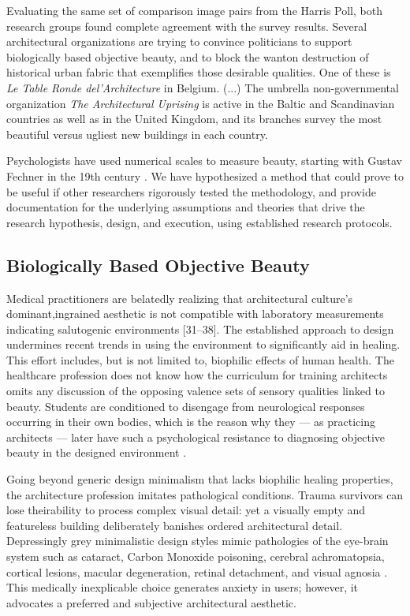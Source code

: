 \documentclass[a4paper]{article}
\begin{document}
Evaluating the same set of comparison image pairs from the Harris Poll, both research groups found complete agreement with the survey results. Several architectural organizations are trying to convince politicians to support biologically based objective beauty, and to block the wanton destruction of historical urban fabric that exemplifies those desirable qualities. One of these is \textit{Le Table Ronde del’Architecture} in Belgium. (...) The umbrella non-governmental organization \textit{The Architectural Uprising} is active in the Baltic and Scandinavian countries as well as in the United Kingdom, and its branches survey the most beautiful versus ugliest new buildings in each country.

Psychologists have used numerical scales to measure beauty, starting with Gustav Fechner in the 19th century \cite{brielmann_intense_2019}. We have hypothesized a method that could prove to be useful if other researchers rigorously tested the methodology, and provide documentation for the underlying assumptions and theories that drive the research hypothesis, design, and execution, using established research protocols.

\subsection{Biologically Based Objective Beauty}

Medical practitioners are belatedly realizing that architectural culture’s dominant,ingrained aesthetic is not compatible with laboratory measurements indicating salutogenic environments [31–38]. The established approach to design undermines recent trends in using the environment to significantly aid in healing. This effort includes, but is not limited to, biophilic effects of human health. The healthcare profession does not know how the curriculum for training architects omits any discussion of the opposing valence sets of sensory qualities linked to beauty. Students are conditioned to disengage from neurological responses occurring in their own bodies, which is the reason why they — as practicing architects — later have such a psychological resistance to diagnosing objective beauty in the designed environment \cite{salingaros_what_2017}.

Going beyond generic design minimalism that lacks biophilic healing properties, the architecture profession imitates pathological conditions. Trauma survivors can lose theirability to process complex visual detail: yet a visually empty and featureless building deliberately banishes ordered architectural detail. Depressingly grey minimalistic design styles mimic pathologies of the eye-brain system such as cataract, Carbon Monoxide poisoning, cerebral achromatopsia, cortical lesions, macular degeneration, retinal detachment, and visual agnosia \cite[Chapter 4]{salingaros_theory_2008}. This medically inexplicable choice generates anxiety in users; however, it advocates a preferred and subjective architectural aesthetic.
\end{document}
